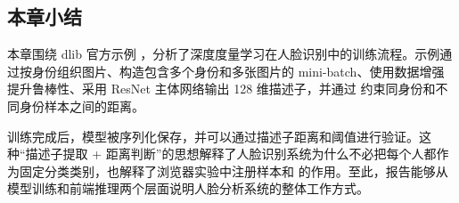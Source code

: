 \subsection{本章小结}

本章围绕 dlib 官方示例 ，分析了深度度量学习在人脸识别中的训练流程。示例通过按身份组织图片、构造包含多个身份和多张图片的 mini-batch、使用数据增强提升鲁棒性、采用 ResNet 主体网络输出 128 维描述子，并通过  约束同身份和不同身份样本之间的距离。

训练完成后，模型被序列化保存，并可以通过描述子距离和阈值进行验证。这种“描述子提取 + 距离判断”的思想解释了人脸识别系统为什么不必把每个人都作为固定分类类别，也解释了浏览器实验中注册样本和  的作用。至此，报告能够从模型训练和前端推理两个层面说明人脸分析系统的整体工作方式。
